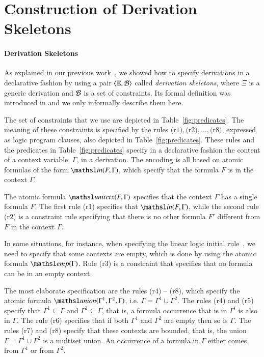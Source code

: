 \documentclass[a4paper,10pt]{article}
\newcommand{\elin}[2]{\ensuremath{{\tsl{unitctx}(\ensuremath{#1}, \ensuremath{#2})}}}
\newcommand{\emp}[1]{\ensuremath{{\tsl{emp}(\ensuremath{#1})}}}
\newcommand{\union}[3]{\ensuremath{{\tsl{union}(\ensuremath{#1},\ensuremath{#2},\ensuremath{ #3})}}}
\newcommand{\In}[2]{\ensuremath{\tsl{in}(\ensuremath{#1},\ensuremath{#2})}}
\begin{document}
\section{Construction of Derivation Skeletons}

\paragraph{Derivation Skeletons}
As explained in our previous work~\cite{nigam13iclp}, we showed how to specify derivations in a declarative fashion 
by using a pair $\langle\Xi, {\cal B}\rangle$ called \emph{derivation skeletons}, where $\Xi$ is a generic derivation and 
${\cal B}$ is a set of constraints.
Its formal definition was introduced in \cite{nigam13iclp} and we only informally describe them here.   

The set of constraints that we use are depicted in Table~\ref{fig:predicates}.
The meaning of these constraints is specified by the rules $\textrm{(r1)},
\textrm{(r2)},\ldots, \textrm{(r8)}$, expressed as logic program clauses, 
also depicted in Table~\ref{fig:predicates}. These
rules and the predicates in Table~\ref{fig:predicates} specify in a declarative 
fashion the content of a context variable, $\Gamma$, in a derivation.
The encoding is all based on atomic formulas of the form $\In{F}{\Gamma}$, which 
specify that the formula $F$ is in the context $\Gamma$. 

The atomic formula $\elin{F}{\Gamma}$ specifies that the context $\Gamma$ has a
single formula $F$. 
The first rule (r1) specifies that $\In{F}{\Gamma}$, while the second rule (r2) is a constraint
rule specifying that there is no other formula $F'$ different from $F$ in the context $\Gamma$.

In some situations, for instance, when specifying the linear logic initial rule~\cite{girard87tcs}, 
we need to specify that some contexts are empty, which is done by using the atomic formula $\emp{\Gamma}$.  
Rule (r3) is a constraint that specifies that no formula can be in an empty context.
 
The most elaborate specification are the rules (r4) -- (r8), which specify the atomic formula 
$\union{\Gamma^1} {\Gamma^2} {\Gamma}$, i.e. $\Gamma = \Gamma^1 \cup \Gamma^2$.
The rules (r4) and (r5) specify that $\Gamma^1 \subseteq \Gamma$ and $\Gamma^2 \subseteq \Gamma$, 
that is, a formula occurrence that is in $\Gamma^i$ is also in $\Gamma$. The rule (r6) specifies that 
if both $\Gamma^1$ and $\Gamma^2$ are empty then so is $\Gamma$. 
The rules (r7) and (r8) 
specify that these contexts are bounded, that is, the union 
$\Gamma = \Gamma^1 \cup \Gamma^2$ is a multiset union. An occurrence of a formula in $\Gamma$ either comes
from $\Gamma^1$ or from $\Gamma^2$.  
\end{document}
